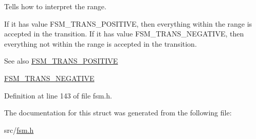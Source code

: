 \-Tells how to interpret the range. 

\-If it has value \-F\-S\-M\-\_\-\-T\-R\-A\-N\-S\-\_\-\-P\-O\-S\-I\-T\-I\-V\-E, then everything within the range is accepted in the transition. \-If it has value \-F\-S\-M\-\_\-\-T\-R\-A\-N\-S\-\_\-\-N\-E\-G\-A\-T\-I\-V\-E, then everything not within the range is accepted in the transition.

\begin{DoxySeeAlso}{\-See also}
\hyperlink{fsm_8h_a792cb9bba1114fc1a5d50457e54b5478}{\-F\-S\-M\-\_\-\-T\-R\-A\-N\-S\-\_\-\-P\-O\-S\-I\-T\-I\-V\-E} 

\hyperlink{fsm_8h_a65d49ee6a31fba2735a0fa4e7235ae7f}{\-F\-S\-M\-\_\-\-T\-R\-A\-N\-S\-\_\-\-N\-E\-G\-A\-T\-I\-V\-E} 
\end{DoxySeeAlso}


\-Definition at line 143 of file fsm.\-h.



\-The documentation for this struct was generated from the following file\-:\begin{DoxyCompactItemize}
\item 
src/\hyperlink{fsm_8h}{fsm.\-h}\end{DoxyCompactItemize}
